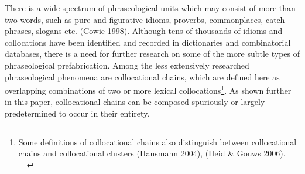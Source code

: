 \documentclass[12pt]{article}
\newenvironment{styleStandard}{\setlength\leftskip{0cm}\setlength\rightskip{0cm plus 1fil}\setlength\parindent{0cm}\setlength\parfillskip{0pt plus 1fil}\setlength\parskip{0in plus 1pt}\writerlistparindent\writerlistleftskip\leavevmode\normalfont\normalsize\writerlistlabel\ignorespaces}{\unskip\vspace{0.111in plus 0.0111in}\par}
\newcommand\writerlistleftskip{}
\newcommand\writerlistparindent{}
\newcommand\writerlistlabel{}
\begin{document}
\begin{styleStandard}
There is a wide spectrum of phraseological units which may consist of more than two words, such as pure and figurative idioms, proverbs, commonplaces, catch phrases, slogans etc. (Cowie 1998). Although tens of thousands of idioms and collocations have been identified and recorded in dictionaries and combinatorial databases, there is a need for further research on some of the more subtle types of phraseological prefabrication. Among the less extensively researched phraseological phenomena are collocational chains, which are defined here as overlapping combinations of two or more lexical collocations\footnote{ Some definitions of collocational chains also distinguish between collocational chains and collocational clusters (Hausmann 2004), (Heid \& Gouws 2006). \ \ }. As shown further in this paper, collocational chains can be composed spuriously or largely predetermined to occur in their entirety.
\end{styleStandard}
\end{document}
